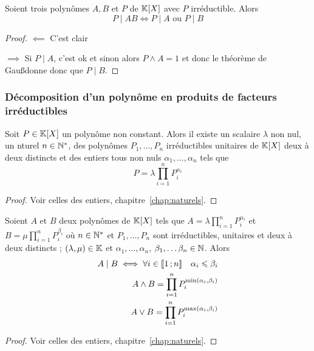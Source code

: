 \begin{prop}
  Soient trois polynômes \(A,B\) et \(P\) de \(\mathbb{K}[X]\) avec \(P\) irréductible. Alors
  \begin{equation}
    P\mid{}AB \iff P\mid{}A \text{~ou~} P\mid{}B
  \end{equation}
\end{prop}
\begin{proof}
  \(\impliedby\) C'est clair

  \(\implies\) Si \(P\mid{}A\), c'est ok et sinon alors \(P \wedge A=1\) et donc le théorème de Gau\ss donne donc que \(P\mid{}B\).
\end{proof}

\subsubsection{Décomposition d'un polynôme en produits de facteurs irréductibles}

\begin{theo}
  Soit \(P \in \mathbb{K}[X]\) un polynôme non constant. Alors il existe un scalaire \(\lambda\) non nul, un nturel \(n \in \mathbb{N}^*\), des polynômes \(P_1, \ldots, P_n\) irréductibles unitaires de \(\mathbb{K}[X]\) deux à deux distincts et des entiers tous non nuls \(\alpha_1, \ldots, \alpha_n\) tels que
  \begin{equation}
    P = \lambda \prod_{i=1}^n P_i^{\alpha_i}
  \end{equation}
\end{theo}
\begin{proof}
  Voir celles des entiers, chapitre~\ref{chap:naturels}.
\end{proof}

\begin{cor}
  Soient \(A\) et \(B\) deux polynômes de \(\mathbb{K}[X]\) tels que \(A=\lambda \prod_{i=1}^n P_i^{\alpha_i}\) et \(B=\mu \prod_{i=1}^n P_i^{\beta_i}\) où \(n \in \mathbb{N}^*\) et \(P_1, \ldots, P_n\) sont irréductibles, unitaires et deux à deux distincts ; \((\lambda, \mu)\in\mathbb{K}\) et \(\alpha_1, \ldots, \alpha_n\), \(\beta_1,\ldots \beta_n \in \mathbb{N}\). Alors
  \begin{align}
    A\mid{}B \iff \forall i \in \mathopen{\llbracket}1\mathclose{}\mathpunct{};n\mathclose{\rrbracket} \quad \alpha_i \leqslant \beta_i \\
    A \wedge B = \prod_{i=1}^n P_i^{\min(\alpha_i,\beta_i)}\\
    A \vee B = \prod_{i=1}^n P_i^{\max(\alpha_i,\beta_i)}
  \end{align}
\end{cor}
\begin{proof}
  Voir celles des entiers, chapitre~\ref{chap:naturels}.
\end{proof}
